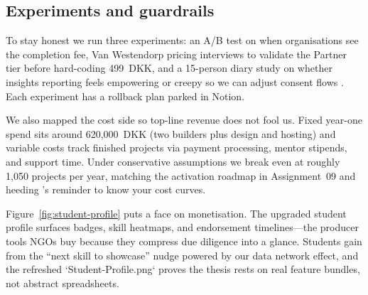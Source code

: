 \subsection*{Experiments and guardrails}
To stay honest we run three experiments: an A/B test on when organisations see the completion fee, Van Westendorp pricing interviews to validate the Partner tier before hard-coding 499~DKK, and a 15-person diary study on whether insights reporting feels empowering or creepy so we can adjust consent flows \citep{Reillier2017}. Each experiment has a rollback plan parked in Notion.

We also mapped the cost side so top-line revenue does not fool us. Fixed year-one spend sits around 620,000~DKK (two builders plus design and hosting) and variable costs track finished projects via payment processing, mentor stipends, and support time. Under conservative assumptions we break even at roughly 1,050 projects per year, matching the activation roadmap in Assignment~09 and heeding \citet{ShapiroVarian1999}'s reminder to know your cost curves.

Figure~\ref{fig:student-profile} puts a face on monetisation. The upgraded student profile surfaces badges, skill heatmaps, and endorsement timelines---the producer tools NGOs buy because they compress due diligence into a glance. Students gain from the ``next skill to showcase'' nudge powered by our data network effect, and the refreshed `Student-Profile.png` proves the thesis rests on real feature bundles, not abstract spreadsheets.


